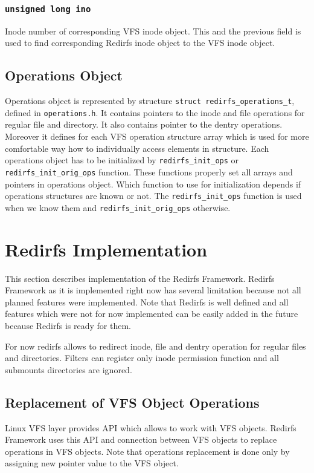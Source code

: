 \subsubsection{\texttt{unsigned long ino}}
Inode number of corresponding VFS inode object. This and the previous field is used to
find corresponding Redirfs inode object to the VFS inode object.

\subsection{Operations Object}
Operations object is represented by structure \texttt{struct redirfs\_operations\_t},
defined in \texttt{operations.h}. It contains pointers to the inode and file
operations for regular file and directory. It also contains pointer to the dentry
operations. Moreover it defines for each VFS operation structure array
which is used for more comfortable way how to individually access elements in
structure. Each operations object has to be initialized by \texttt{redirfs\_init\_ops}
or \texttt{redirfs\_init\_orig\_ops} function. These functions properly set all arrays
and pointers in operations object. Which function to use for initialization depends if
operations structures are known or not. The \texttt{redirfs\_init\_ops} function is
used when we know them and \texttt{redirfs\_init\_orig\_ops} otherwise.

\section{Redirfs Implementation}
This section describes implementation of the Redirfs Framework. Redirfs Framework as
it is implemented right now has several limitation because not all planned features
were implemented. Note that Redirfs is well defined and all features which were not
for now implemented can be easily added in the future because Redirfs is ready for
them.

For now redirfs allows to redirect inode, file and dentry operation for regular files
and directories. Filters can register only inode permission function and all submounts
directories are ignored.

\subsection{Replacement of VFS Object Operations}
Linux VFS layer provides API which allows to work with VFS objects. Redirfs Framework
uses this API and connection between VFS objects to replace operations in VFS objects.
Note that operations replacement is done only by assigning new pointer value to the
VFS object.

